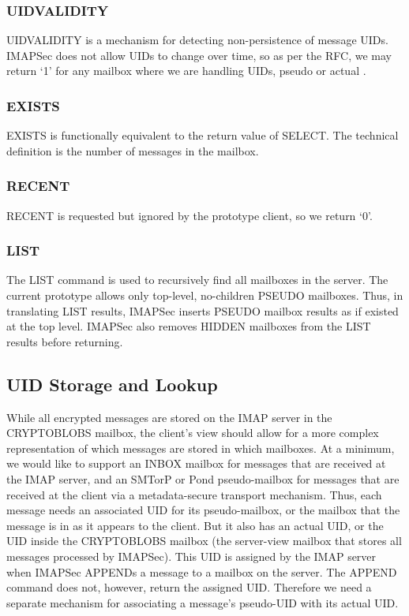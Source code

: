 \documentclass[pageno]{jpaper}
\newcommand{\project}{IMAPSec }
\newcommand{\projectnospace}{IMAPSec}
\begin{document}
\subsubsection{UIDVALIDITY} UIDVALIDITY is a mechanism for detecting non-persistence of message UIDs. \project does not allow UIDs to change over time, so as per the RFC, we may return `1' for any mailbox where we are handling UIDs, pseudo or actual \cite{rfc3501}.

\subsubsection{EXISTS}
\label{exists}

EXISTS is functionally equivalent to the return value of SELECT. The technical definition is the number of messages in the mailbox.

\subsubsection{RECENT} RECENT is requested but ignored by the prototype client, so we return `0'.

\subsubsection{LIST} The LIST command is used to recursively find all mailboxes in the server. The current prototype allows only top-level, no-children PSEUDO mailboxes. Thus, in translating LIST results, \project inserts PSEUDO mailbox results as if existed at the top level. \project also removes HIDDEN mailboxes from the LIST results before returning.

\subsection{UID Storage and Lookup}
\label{uid-translation}

While all encrypted messages are stored on the IMAP server in the CRYPTOBLOBS mailbox, the client's view should allow for a more complex representation of which messages are stored in which mailboxes. At a minimum, we would like to support an INBOX mailbox for messages that are received at the IMAP server, and an SMTorP or Pond pseudo-mailbox for messages that are received at the client via a metadata-secure transport mechanism. Thus, each message needs an associated UID for its pseudo-mailbox, or the mailbox that the message is in as it appears to the client. But it also has an actual UID, or the UID inside the CRYPTOBLOBS mailbox (the server-view mailbox that stores all messages processed by \projectnospace). This UID is assigned by the IMAP server when \project APPENDs a message to a mailbox on the server. The APPEND command does not, however, return the assigned UID. Therefore we need a separate mechanism for associating a message's pseudo-UID with its actual UID.
\end{document}

